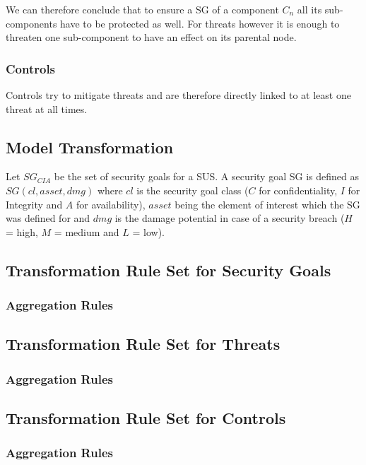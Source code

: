 We can therefore conclude that to ensure a SG of a component $C_n$ all its sub-components have to be protected as well. For threats however it is enough to threaten one sub-component to have an effect on its parental node.

\subsubsection*{Controls}

Controls try to mitigate threats and are therefore directly linked to at least one threat at all times. 

\subsection{Model Transformation}

Let $SG_{CIA}$ be the set of security goals for a SUS. A security goal SG is defined as $SG(cl, asset, dmg)$ where $cl$ is the security goal class ($C$ for confidentiality, $I$ for Integrity and $A$ for availability), $asset$ being the element of interest which the SG was defined for and $dmg$ is the damage potential in case of a security breach ($H$ = high, $M$ = medium and $L$ = low).

\subsection{Transformation Rule Set for Security Goals}
\label{subsec:sec_goals_rules}
\subsubsection{Aggregation Rules}
\subsection{Transformation Rule Set for Threats}
\label{subsec:threat_rules}
\subsubsection{Aggregation Rules}
\subsection{Transformation Rule Set for Controls}
\subsubsection{Aggregation Rules}

